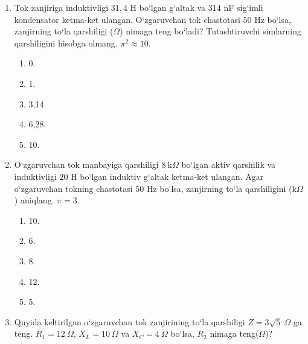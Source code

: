 \begin{enumerate}
\item Tok zanjiriga induktivligi $31,4$ H bo‘lgan g‘altak va $314$ nF sig‘imli kondensator ketma-ket ulangan. O‘zgaruvchan tok chastotasi $50$ Hz bo‘lsa, zanjirning to‘la qarshiligi ($\Omega$) nimaga teng bo‘ladi? Tutashtiruvchi simlarning qarshiligini hisobga olmang. $\pi^2\approx10$.
\begin{enumerate}[label=\Alph*)]
\item 0.
\item 1.
\item 3,14.
\item 6,28.
\item 10.
\end{enumerate}

\item O‘zgaruvchan tok manbayiga qarshiligi $8~\text{k}\Omega$ bo‘lgan aktiv qarshilik va induktivligi $20$ H bo‘lgan induktiv g‘altak ketma-ket ulangan. Agar o‘zgaruvchan tokning chastotasi $50$ Hz bo‘lsa, zanjirning to‘la qarshiligini (k$\Omega$) aniqlang. $\pi=3$.
\begin{enumerate}[label=\Alph*)]
\item 10.
\item 6.
\item 8.
\item 12.
\item 5.
\end{enumerate}

\item Quyida keltirilgan o‘zgaruvchan tok zanjirining to‘la qarshiligi $Z=3\sqrt5~\Omega$ ga teng. $R_1=12~\Omega$, $X_L=10~\Omega$ va $X_C=4~\Omega$ bo‘lsa, $R_2$ nimaga teng($\Omega$)?

\end{enumerate}
